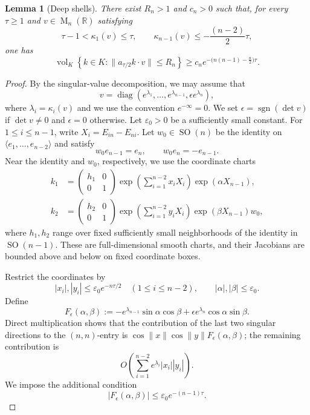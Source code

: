 \documentclass[reqno,11pt]{amsart}
\numberwithin{equation}{section}
\newtheorem{lemma}[theorem]{Lemma}
\theoremstyle{definition}
\theoremstyle{remark}
\newcommand{\op}{\operatorname}
\newcommand{\R}{\mathbb R}
\newcommand{\SO}{\op{SO}}
\newcommand{\M}{\op{M}}
\begin{document}
\begin{lemma}[Deep shells]
\label{lem:deep-shell-weyl-box}
There exist $R_n>1$ and $c_n>0$ such that, for every $\tau\ge1$ and
$v\in\M_n(\R)$ satisfying
\begin{equation}\label{eq:deep-shell-hypotheses}
\tau-1<\kappa_1(v)\le \tau,
\qquad
\kappa_{n-1}(v)\le-\frac{(n-2)}{2}\tau,
\end{equation}
one has
\begin{equation}\label{eq:deep-shell-lower-bound}
\operatorname{vol}_K
\left\{k\in K:
\|a_{\tau/2}k\cdot v\|\le R_n
\right\}
\ge
c_n e^{-\bigl(n(n-1)-\frac n2\bigr)\tau}.
\end{equation}
\end{lemma}
\begin{proof}
By the singular-value decomposition, we may assume that
$$
v=
\operatorname{diag}
(e^{\lambda_1},\ldots,e^{\lambda_{n-1}},
\epsilon e^{\lambda_n}),
$$
where $\lambda_i=\kappa_i(v)$ and we use the convention
$e^{-\infty}=0$. We set
$\epsilon=\operatorname{sgn}(\det v)$ if $\det v\ne0$ and
$\epsilon=0$ otherwise.
Let $\varepsilon_0>0$ be a sufficiently small constant.
For $1\le i\le n-1$, write
$X_i=E_{in}-E_{ni}$. Let $w_0\in\SO(n)$ be the identity on
$\langle e_1,\ldots,e_{n-2}\rangle$ and satisfy
$$
w_0e_{n-1}=e_n,
\qquad
w_0e_n=-e_{n-1}.
$$
Near the identity and $w_0$, respectively, we use the coordinate charts
$$
\begin{aligned}
k_1&=
\begin{pmatrix}h_1&0\\0&1\end{pmatrix}
\exp\left(\sum_{i=1}^{n-2}x_iX_i\right)
\exp(\alpha X_{n-1}),\\
k_2&=
\begin{pmatrix}h_2&0\\0&1\end{pmatrix}
\exp\left(\sum_{i=1}^{n-2}y_iX_i\right)
\exp(\beta X_{n-1})w_0,
\end{aligned}
$$
where $h_1,h_2$ range over fixed sufficiently small neighborhoods of the identity in
$\SO(n-1)$. These are full-dimensional smooth charts, and their
Jacobians are bounded above and below on fixed coordinate boxes.

Restrict the coordinates by
\begin{equation}\label{eq:smallboxrestriction}
|x_i|,|y_i|\le\varepsilon_0e^{-n\tau/2}
\quad(1\le i\le n-2),
\qquad
|\alpha|,|\beta|\le\varepsilon_0.
\end{equation}
Define
$$
F_\epsilon(\alpha,\beta)
:=
-e^{\lambda_{n-1}}\sin\alpha\cos\beta
+\epsilon e^{\lambda_n}\cos\alpha\sin\beta.
$$
Direct multiplication shows that the contribution of the last two
singular directions to the $(n,n)$-entry is
$\cos\|x\|\cos\|y\|F_\epsilon(\alpha,\beta)$; the remaining
contribution is
$$
O\left(\sum_{i=1}^{n-2}e^{\lambda_i}|x_i||y_i|\right).
$$
We impose the additional condition
\begin{equation}\label{eq:deep-strip-condition}
|F_\epsilon(\alpha,\beta)|
\le
\varepsilon_0e^{-(n-1)\tau}.
\end{equation}


\end{proof}
\end{document}
